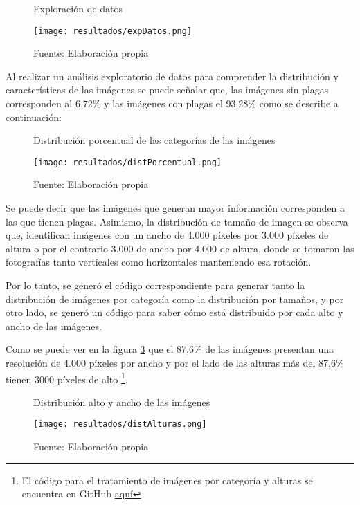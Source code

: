 \newpage

\begin{figure}[h]
\centering
\caption{Exploración de datos}
\texttt{[image: resultados/expDatos.png]}
\caption*{\footnotesize Fuente: Elaboración propia}
\label{fig:figuraExpDatos}
\end{figure}

Al realizar un análisis exploratorio de datos para comprender la distribución y características de las imágenes se puede señalar que, las imágenes sin plagas corresponden al 6,72\% y las imágenes con plagas el 93,28\% como se describe a continuación:

\newpage

\begin{figure}[h]
\centering
\caption{Distribución porcentual de las categorías de las imágenes}
\texttt{[image: resultados/distPorcentual.png]}
\caption*{\footnotesize Fuente: Elaboración propia}
\label{fig:figuraDistPorcentual}
\end{figure}

Se puede decir que las imágenes que generan mayor información corresponden a las que tienen plagas. Asimismo, la distribución de tamaño de imagen se observa que, identifican imágenes con un ancho de 4.000 píxeles por 3.000 píxeles de altura o por el contrario 3.000 de ancho por 4.000 de altura, donde se tomaron las fotografías tanto verticales como horizontales manteniendo esa rotación.

Por lo tanto, se generó el código correspondiente para generar tanto la distribución de imágenes por categoría como la distribución por tamaños, y por otro lado, se generó un código para saber cómo está distribuido por cada alto y ancho de las imágenes. 

Como se puede ver en la figura \ref{fig:figuraDistAlturas} que el 87,6\% de las imágenes presentan una resolución de 4.000 píxeles por ancho y por el lado de las alturas más del 87,6\% tienen 3000 píxeles de alto \footnote{El código para el tratamiento de imágenes por categoría y alturas se encuentra en GitHub \href{https://github.com/juferoto/mlops_project/blob/master/notebooks/analisisExploratorio.ipynb}{aquí}}.

\begin{figure}[h]
\centering
\caption{Distribución alto y ancho de las imágenes}
\texttt{[image: resultados/distAlturas.png]}
\caption*{\footnotesize Fuente: Elaboración propia}
\label{fig:figuraDistAlturas}
\end{figure}

